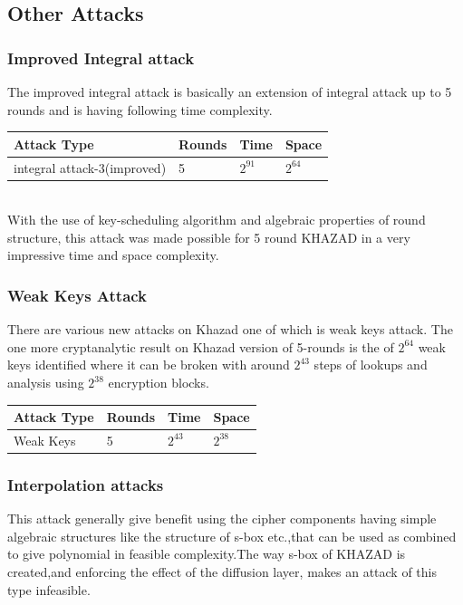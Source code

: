 \documentclass[preprint]{transcrypto}
\begin{document}
\newpage

\subsection{Other Attacks}
\subsubsection{Improved Integral attack}\cite{2}
The improved integral attack is basically an extension of integral attack up to 5 rounds and is having following time complexity.\cite{1}
\begin{table}[h]
\centering
\begin{tabular}{|l|l|l|l|}
\hline
Attack Type     & Rounds & Time     & Space \\ \hline
integral attack-3(improved) & 5      & $2^{91}$ & $2^{64}$ \\ \hline
\end{tabular}
\end{table}\\
With the use of key-scheduling algorithm and algebraic properties of round structure, this attack was made possible for 5 round KHAZAD in a very impressive time and space complexity. 
\subsubsection{Weak Keys Attack}\cite{2}
There are various new attacks on Khazad one of which is weak keys attack. The one more cryptanalytic result on Khazad version of 5-rounds is the of $2^{64}$ weak keys identified where it can be broken with around 
$2^{43}$ steps of lookups and analysis using $2^{38}$ encryption blocks.\\

\begin{table}[h]
\centering
\begin{tabular}{|l|l|l|l|}
\hline
Attack Type     & Rounds & Time     & Space \\ \hline
Weak Keys & 5      & $2^{43}$ & $2^{38}$ \\ \hline
\end{tabular}
\end{table}

\subsubsection{Interpolation attacks}\cite{2}
This attack generally give benefit using the cipher components having simple algebraic structures like the structure of s-box etc.,that can be used as combined to give
polynomial in feasible complexity.The way s-box of KHAZAD is created,and enforcing the effect of the diffusion
layer, makes an attack of this type infeasible.
\end{document}
